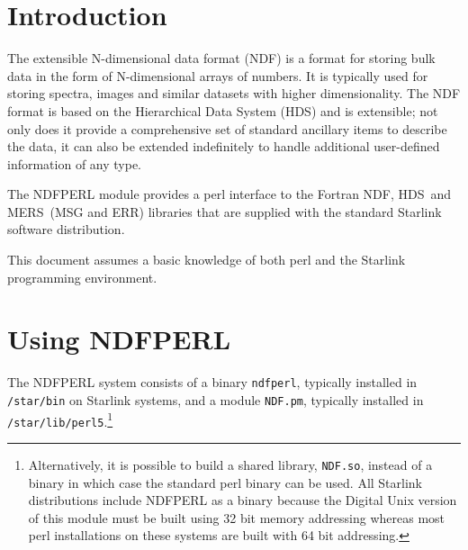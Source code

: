 \documentclass[twoside,11pt]{article}
\newcommand{\stardocinitials}  {SUN}
\newcommand{\stardocnumber}    {[number].[version]}
\newcommand{\stardocabstract}  {[Text of abstract]}
\newcommand{\ndf}{\xref{NDF}{sun33}{}}
\newcommand{\hds}{\xref{HDS}{sun92}{}}
\newcommand{\mers}{\xref{MERS}{sun104}{}}
\newcommand{\stardocname}{\stardocinitials /\stardocnumber}
\newenvironment{latexonly}{}{}
\newcommand{\xref}[3]{#1}
\newcommand{\xlabel}[1]{}
\newcommand{\latexonlytoc}[0]{\tableofcontents}
\begin{document}
  \begin{latexonly}
    \setlength{\parskip}{0mm}
    \latexonlytoc
    \setlength{\parskip}{\medskipamount}
    \markboth{\stardocname}{\stardocname}
  \end{latexonly}

\newpage
\section{\xlabel{introduction}\label{introduction}Introduction}

The extensible N-dimensional data format (NDF) is a format for storing bulk
data in the form of N-dimensional arrays of numbers.  It is typically used
for storing spectra, images and similar datasets with higher dimensionality.
The NDF format is based on the Hierarchical Data System (HDS) and is
extensible; not only does it provide a comprehensive set of standard
ancillary items to describe the data, it can also be extended indefinitely
to handle additional user-defined information of any type.

The NDFPERL module provides a perl interface to the Fortran \ndf, \hds\ and
\mers\ (MSG and ERR) libraries that are supplied with the standard Starlink
software distribution.

This document assumes a basic knowledge of both perl and the Starlink
programming environment.


\section{\xlabel{using_ndfperl}\label{using_ndfperl}Using NDFPERL}

The NDFPERL system consists of a binary \texttt{ndfperl}, typically
installed in \texttt{/star/bin} on Starlink systems, and a module
\texttt{NDF.pm}, typically installed in
\texttt{/star/lib/perl5}.\footnote{Alternatively, it is possible to build a
shared library, \texttt{NDF.so}, instead of a binary in which case the
standard perl binary can be used.  All Starlink distributions include NDFPERL
as a binary because the Digital Unix version of this module must be
built using 32 bit memory addressing whereas most perl installations on these
systems are built with 64 bit addressing.}
\end{document}

